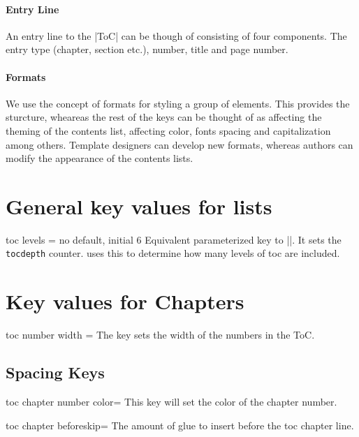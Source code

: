 \paragraph{Entry Line} An entry line to the |ToC| can be though of consisting of four components. The entry type (chapter, section etc.), number, title and page number. 

\paragraph{Formats} We use the concept of formats for styling a group of elements. This provides the sturcture,
wheareas the rest of the keys can be thought of as affecting the theming of the contents list, affecting color, fonts spacing and capitalization among others. Template designers can develop new formats, whereas authors can modify the appearance of the contents lists. 

\section{General key values for lists}

\begin{docKey}[phd]{toc levels}{ =  } {no default, initial 6}
 Equivalent parameterized key to |\toclevel|. It sets  the \texttt{tocdepth} counter. 
 \latex uses this to determine how many levels of toc are included.
\end{docKey}



\section{Key values for Chapters}




\begin{docKey}[phd]{toc number width}{ = }{}
The key sets the width of the numbers in the ToC. 
\end{docKey}

\subsection{Spacing Keys}
\begin{docKey}[phd]{toc chapter number color}{=}{}
This key will set the color of the chapter number.
\end{docKey}

\begin{docKey}[phd]{toc chapter beforeskip}{=}{}
The amount of glue to insert before the toc chapter line.
\end{docKey}

